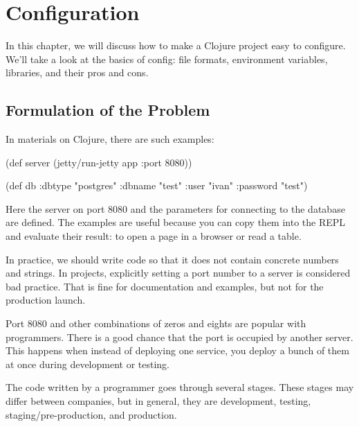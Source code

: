 \chapter{Configuration}


\label{chapter-config}

\begin{teaser}
In this chapter, we will discuss how to make a Clojure project easy to configure. We'll take a look at the basics of config: file formats, environment variables, libraries, and their pros and cons.
\end{teaser}

\section{Formulation of the Problem}

In materials on Clojure, there are such examples:

\begin{english}
  \begin{clojure}
(def server
  (jetty/run-jetty app {:port 8080}))

(def db {:dbtype   "postgres"
         :dbname   "test"
         :user     "ivan"
         :password "test"})
  \end{clojure}
\end{english}

Here the server on port 8080 and the parameters for connecting to the database are defined. The examples are useful because you can copy them into the REPL and evaluate their result: to open a page in a browser or read a table.

In practice, we should write code so that it does not contain concrete numbers and strings. In projects, explicitly setting a port number to a server is considered bad practice. That is fine for documentation and examples, but not for the production launch.

Port 8080 and other combinations of zeros and eights are popular with programmers. There is a good chance that the port is occupied by another server. This happens when instead of deploying one service, you deploy a bunch of them at once during development or testing.

The code written by a programmer goes through several stages. These stages may differ between companies, but in general, they are development, testing, staging/pre-production, and production.

\label{hardcode}

